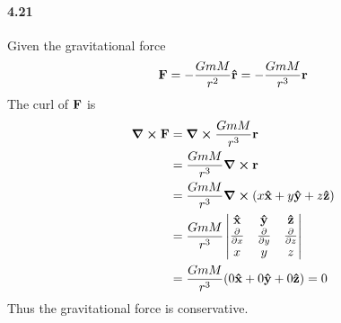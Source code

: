 \documentclass[../problems.tex]{subfiles}
\begin{document}
\paragraph{4.21}
Given the gravitational force
\begin{align*}
    \vb{F} = - \frac{GmM}{r^2} \vu{r} = - \frac{GmM}{r^3} \vb{r}
\end{align*}
The curl of $\vb{F}$ is
\begin{align*}
    \curl{\vb{F}} &= \curl{\frac{GmM}{r^3} \vb{r}} \\
    &= \frac{GmM}{r^3} \curl{\vb{r}} \\
    &= \frac{GmM}{r^3} \curl{(x \vu{x} + y \vu{y} + z \vu{z})} \\
    &= \frac{GmM}{r^3}
    \begin{vmatrix}
        \vu{x} & \vu{y} & \vu{z} \\
        \pdv{x} & \pdv{y} & \pdv{z} \\
        x & y & z
    \end{vmatrix} \\
    &= \frac{GmM}{r^3} (0 \vu{x} + 0 \vu{y} + 0 \vu{z}) = 0
\end{align*}
Thus the gravitational force is conservative.
\end{document}
